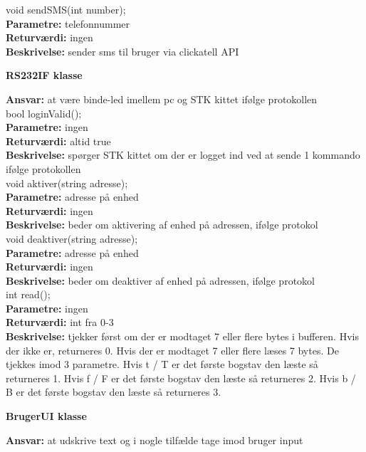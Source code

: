 void sendSMS(int number); \\
\textbf{Parametre:} telefonnummer \\
\textbf{Returværdi:} ingen \\
\textbf{Beskrivelse:} sender sms til bruger via clickatell API \\

{\centering 
\textbf{RS232IF klasse}\par
}
\textbf{Ansvar:} at være binde-led imellem pc og STK kittet ifølge protokollen \\

bool loginValid(); \\
\textbf{Parametre:} ingen \\
\textbf{Returværdi:} altid true\\
\textbf{Beskrivelse:} spørger STK kittet om der er logget ind ved at sende 1 kommando ifølge protokollen \\

void aktiver(string adresse); \\
\textbf{Parametre:} adresse på enhed \\
\textbf{Returværdi:} ingen \\
\textbf{Beskrivelse:} beder om aktivering af enhed på adressen, ifølge protokol \\

void deaktiver(string adresse); \\
\textbf{Parametre:} adresse på enhed \\
\textbf{Returværdi:} ingen \\
\textbf{Beskrivelse:} beder om deaktiver af enhed på adressen, ifølge protokol \\

int read(); \\
\textbf{Parametre:} ingen\\
\textbf{Returværdi:} int fra 0-3 \\
\textbf{Beskrivelse:} tjekker først om der er modtaget 7 eller flere bytes i bufferen. Hvis der ikke er, returneres 0. Hvis der er modtaget 7 eller flere læses 7 bytes. De tjekkes imod 3 parametre. Hvis t / T er det første bogstav den læste så returneres 1. Hvis f / F er det første bogstav den læste så returneres 2. Hvis b / B er det første bogstav den læste så returneres 3.  \\

{\centering 
\textbf{BrugerUI klasse}\par
}
\textbf{Ansvar:} at udskrive text og i nogle tilfælde tage imod bruger input \\

